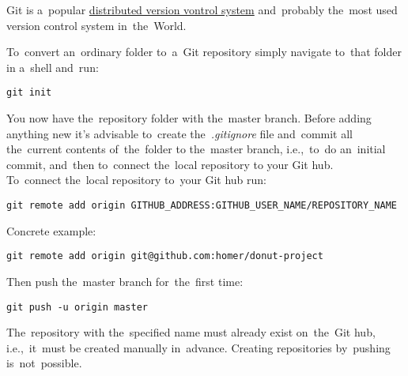 \label{git}
Git is a~popular \hyperref[distributedversioncontrolsystem]{distributed version vontrol system} and~probably the~most used version control system in~the~World.

To~convert an~ordinary folder to~a~Git repository simply navigate to~that folder in a~shell and~run:
\begin{lstlisting}[frame=no]
    git init
\end{lstlisting}
\noindent You now have the~repository folder with the~master branch. Before adding anything new it's advisable to~create the~\textit{.gitignore} file and~commit all the~current contents of~the~folder to the~master branch, i.e.,~to~do an~initial commit, and~then to~connect the~local repository to your Git hub.\\

\noindent To~connect the~local repository to~your Git hub run:
\begin{lstlisting}[frame=no]
    git remote add origin GITHUB_ADDRESS:GITHUB_USER_NAME/REPOSITORY_NAME
\end{lstlisting}
\noindent Concrete example:
\begin{lstlisting}[frame=no]
    git remote add origin git@github.com:homer/donut-project
\end{lstlisting}
\noindent Then push the~master branch for~the~first time:
\begin{lstlisting}[frame=no]
    git push -u origin master
\end{lstlisting}

\newline\warning The~repository with the~specified name must already exist on~the~Git hub, i.e.,~it~must be created manually in~advance. Creating repositories by~pushing is~not~possible.
